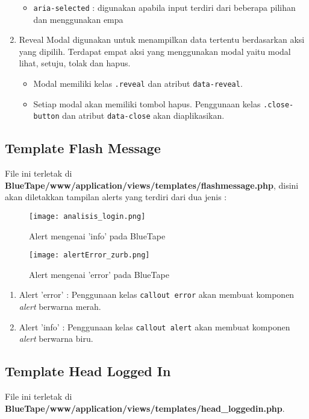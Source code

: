 \begin{enumerate}
\begin{itemize}
		\item \colorbox{mygray}{\texttt{aria-selected}} : digunakan apabila input terdiri dari beberapa pilihan dan menggunakan empa
	\end{itemize}	
	\item Reveal
	Modal digunakan untuk menampilkan data tertentu berdasarkan aksi yang dipilih. Terdapat empat aksi yang menggunakan modal yaitu modal lihat, setuju, tolak dan hapus.
	\begin{itemize}
		\item Modal memiliki kelas \colorbox{mygray}{\texttt{.reveal}} dan atribut \colorbox{mygray}{\texttt{data-reveal}}.
		\item Setiap modal akan memiliki tombol hapus. Penggunaan kelas \texttt{.close-button} dan atribut \colorbox{mygray}{\texttt{data-close}} akan diaplikasikan.			
	\end{itemize} 	 
\end{enumerate}
\subsection{Template Flash Message}
File ini terletak di \textbf{BlueTape/www/application/views/templates/flashmessage.php}, disini akan diletakkan tampilan alerts yang terdiri dari dua jenis :
\begin{figure} [H]
	\centering  
	\texttt{[image: analisis\_login.png]}  
	\caption{Alert mengenai 'info' pada BlueTape}	 
\end{figure}

\begin{figure} [H]
	\centering  
	\texttt{[image: alertError\_zurb.png]}  
	\caption{Alert mengenai 'error' pada BlueTape}	 
\end{figure}
\begin{enumerate}
	\item Alert 'error' : Penggunaan kelas \colorbox{mygray}{\texttt{callout error}} akan membuat komponen \textit{alert} berwarna merah.
	\item Alert 'info' : Penggunaan kelas \colorbox{mygray}{\texttt{callout alert}} akan membuat komponen \textit{alert} berwarna biru.
\end{enumerate}

\subsection{Template Head Logged In}
File ini terletak di \textbf{BlueTape/www/application/views/templates/head\_loggedin.php}.

